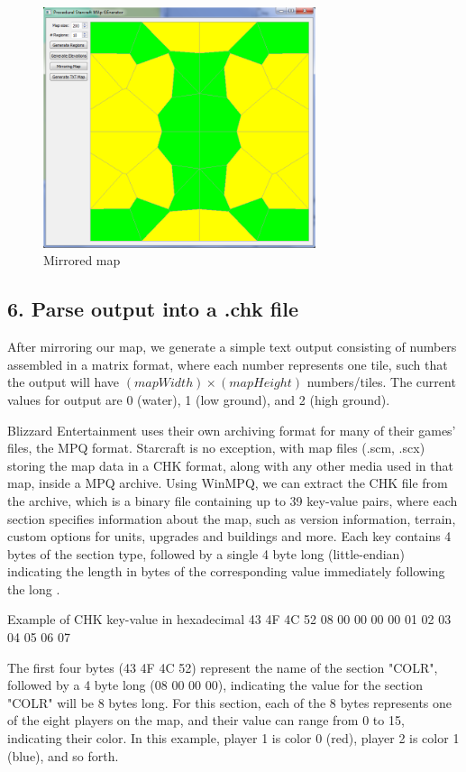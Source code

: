 \documentclass[letterpaper]{article}
\begin{document}
\begin{figure}[h]
    \centering
    \includegraphics[width=8cm]{PCG04.png}
    \caption{Mirrored map}
    \label{fig:mirrored-map}
\end{figure}

\subsection{6. Parse output into a .chk file}
After mirroring our map, we generate a simple text output consisting of numbers assembled in a matrix format, where each number represents one tile, such that the output will have $(mapWidth)  \times (mapHeight)$ numbers/tiles. The current values for output are 0 (water), 1 (low ground), and 2 (high ground).

Blizzard Entertainment uses their own archiving format for many of their games' files, the MPQ format. Starcraft is no exception, with map files (.scm, .scx) storing the map data in a CHK format, along with any other media used in that map, inside a MPQ archive. Using WinMPQ, we can extract the CHK file from the archive, which is a binary file containing up to 39 key-value pairs, where each section specifies information about the map, such as version information, terrain, custom options for units, upgrades and buildings and more. Each key contains 4 bytes of the section type, followed by a single 4 byte long (little-endian) indicating the length in bytes of the corresponding value immediately following the long \cite{Olbrantz}.

Example of CHK key-value in hexadecimal
43 4F 4C 52 08 00 00 00
00 01 02 03 04 05 06 07

The first four bytes (43 4F 4C 52) represent the name of the section "COLR", followed by a 4 byte long (08 00 00 00), indicating the value for the section "COLR" will be 8 bytes long. For this section, each of the 8 bytes represents one of the eight players on the map, and their value can range from 0 to 15, indicating their color. In this example, player 1 is color 0 (red), player 2 is color 1 (blue), and so forth.
\end{document}
